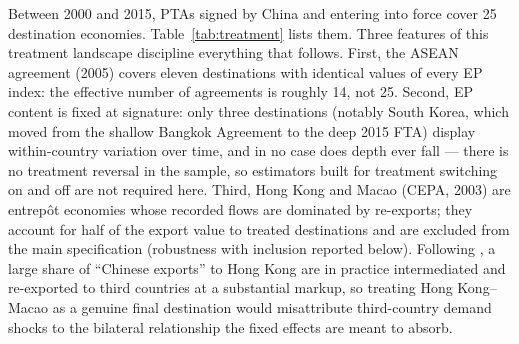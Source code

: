 \documentclass[12pt]{article}
\begin{document}
Between 2000 and 2015, PTAs signed by China and entering into force cover 25 destination
economies. Table~\ref{tab:treatment} lists them. Three features of this treatment
landscape discipline everything that follows. First, the ASEAN agreement (2005) covers
eleven destinations with identical values of every EP index: the effective number of
agreements is roughly 14, not 25. Second, EP content is fixed at signature: only three
destinations (notably South Korea, which moved from the shallow Bangkok Agreement to the
deep 2015 FTA) display within-country variation over time, and in no case does depth
ever fall --- there is no treatment reversal in the sample, so estimators built for
treatment switching on and off are not required here. Third, Hong Kong and Macao
(CEPA, 2003) are entrep\^ot economies whose recorded flows are dominated by re-exports;
they account for half of the export value to treated destinations and are excluded from
the main specification (robustness with inclusion reported below). Following
\citet{feenstra2004}, a large share of ``Chinese exports'' to Hong Kong are in practice
intermediated and re-exported to third countries at a substantial markup, so treating
Hong Kong--Macao as a genuine final destination would misattribute third-country demand
shocks to the bilateral relationship the fixed effects are meant to absorb.
\end{document}
